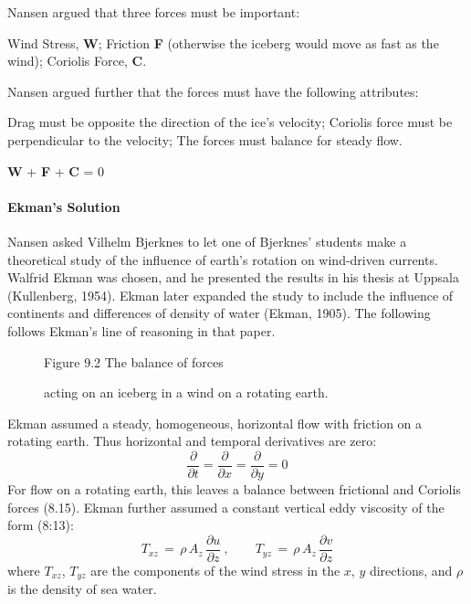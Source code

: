Nansen argued that three forces must be important:
\begin{enumerate}
\vitem Wind Stress, \textbf{W};
\vitem Friction \textbf{F} (otherwise the iceberg would move as fast as the wind);
\vitem Coriolis Force, \textbf{C}.
\end{enumerate}
Nansen argued further that the forces must have the following attributes:
\begin{enumerate}
\vitem Drag must be opposite the direction of the ice's velocity;
\vitem Coriolis force must be perpendicular to the velocity;
\vitem The forces must balance for steady flow.
\end{enumerate}
\begin{center}
\textbf{W} + \textbf{F} + \textbf{C} = 0
\end{center}

\paragraph{Ekman's Solution}
Nansen asked Vilhelm Bjerknes to let one
of Bjerknes' students make a theoretical study of the influence of
earth's rotation on wind-driven currents. Walfrid Ekman was chosen,
and he presented the results in his thesis at Uppsala (Kullenberg,
1954). Ekman later expanded the study to include the influence of
continents and differences of density of water (Ekman, 1905). The
following follows Ekman's line of reasoning in that paper.

\begin{figure}[t!]
\centering
{}
\footnotesize
Figure 9.2 The balance of forces \rule{0mm}{3ex}acting on an iceberg
in a wind on a rotating earth.

\label{fig:forcesketch}
\vspace{-3ex}
\end{figure}

Ekman assumed a steady,
homogeneous, horizontal flow with friction on a rotating earth. Thus
horizontal and temporal derivatives are zero:
\begin{equation}
\frac{\partial}{\partial{t}}=\frac{\partial}{\partial{x}}=\frac{\partial}{\partial{y}}=0
\end{equation}
For flow on a rotating earth, this leaves a balance between frictional
and Coriolis forces (8.15).  Ekman further assumed a constant vertical
eddy viscosity of the form (8:13):
\begin{equation}
T_{xz} \,=\,\rho\, A_z \,\frac{\partial{u}}{\partial{z}}\: , \qquad T_{yz}\,=\,\rho\, A_z \,\frac{\partial{v}}{\partial{z}}
\end{equation}
where $T_{xz}$, $T_{yz}$ are the components of the wind
stress in the $x$, $y$ directions, and
$\rho$ is the density of sea water.

